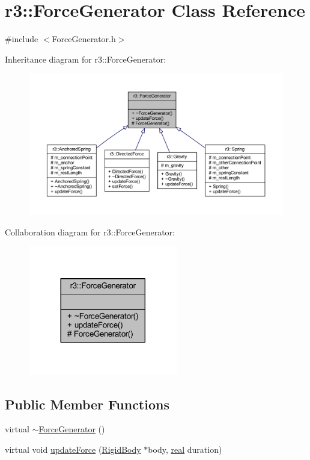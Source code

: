 \hypertarget{classr3_1_1_force_generator}{}\section{r3\+:\+:Force\+Generator Class Reference}
\label{classr3_1_1_force_generator}


{\ttfamily \#include $<$Force\+Generator.\+h$>$}



Inheritance diagram for r3\+:\+:Force\+Generator\+:\nopagebreak
\begin{figure}[H]
\begin{center}
\leavevmode
\includegraphics[width=350pt]{classr3_1_1_force_generator__inherit__graph}
\end{center}
\end{figure}


Collaboration diagram for r3\+:\+:Force\+Generator\+:\nopagebreak
\begin{figure}[H]
\begin{center}
\leavevmode
\includegraphics[width=185pt]{classr3_1_1_force_generator__coll__graph}
\end{center}
\end{figure}
\subsection*{Public Member Functions}
\begin{DoxyCompactItemize}
\item 
virtual \mbox{\hyperlink{classr3_1_1_force_generator_a64f1659bd0cf863ea28cccc689b2be3e}{$\sim$\+Force\+Generator}} ()
\item 
virtual void \mbox{\hyperlink{classr3_1_1_force_generator_a16d1e8aa85d574013de859b95944c5bb}{update\+Force}} (\mbox{\hyperlink{classr3_1_1_rigid_body}{Rigid\+Body}} $\ast$body, \mbox{\hyperlink{namespacer3_ab2016b3e3f743fb735afce242f0dc1eb}{real}} duration)
\end{DoxyCompactItemize}
